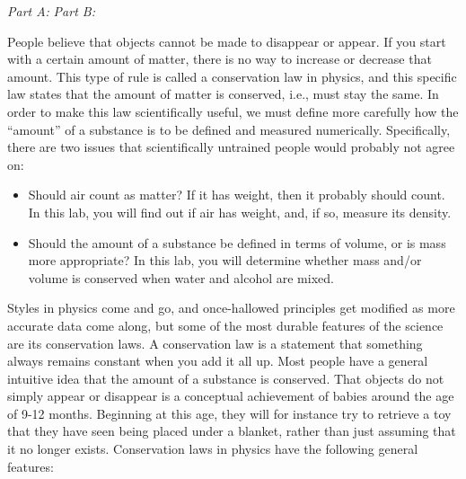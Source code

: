 \label{lab:conservation-laws}

\apparatus
\emph{Part A:}
\emph{Part B: }

\longgoal

People believe that objects cannot be made to disappear or
appear.  If you start with a certain amount of matter, there
is no way to increase or decrease that amount.  This type of
rule is called a conservation law in physics, and this
specific law states that the amount of matter is conserved,
i.e., must stay the same.  In order to make this law
scientifically useful, we must define more carefully how the
``amount'' of a substance is to be defined and measured
numerically.  Specifically, there are two issues that
scientifically untrained people would probably not agree on:

\begin{itemize}
\item[] Should air count as matter?  If it has weight, then it
probably should count.  In this lab, you will find out if
air has weight, and, if so, measure its density.

\item[] Should the amount of a substance be defined in terms of
volume, or is mass more appropriate?  In this lab, you will
determine whether mass and/or volume is conserved when water
and alcohol are mixed.
\end{itemize}

\introduction

Styles in physics come and go, and once-hallowed principles
get modified as more accurate data come along, but some of
the most durable features of the science are its conservation
laws.  A conservation law is a statement that something
always remains constant when you add it all up.  Most people
have a general intuitive idea that the amount of a substance
is conserved.  That objects do not simply appear or
disappear is a conceptual achievement of babies around the
age of 9-12 months.  Beginning at this age, they will for
instance try to retrieve a toy that they have seen being
placed under a blanket, rather than just assuming that it no
longer exists. Conservation laws in physics have the
following general features:

